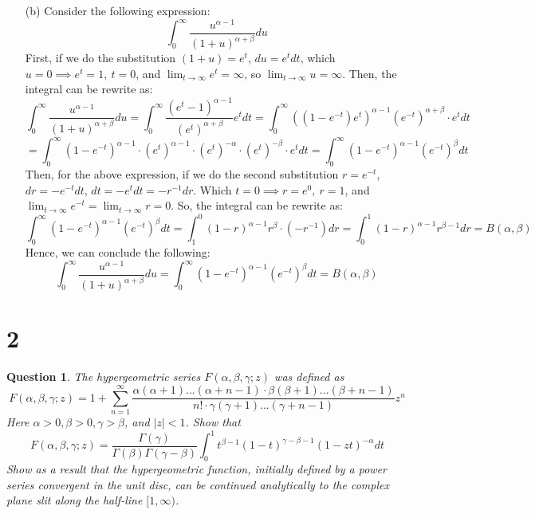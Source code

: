 \documentclass{article}
\newtheorem{question}{Question}
\begin{document}
\begin{itemize}
    \item[(b)] Consider the following expression:
    $$\int_{0}^{\infty}\frac{u^{\alpha-1}}{(1+u)^{\alpha+\beta}}du$$
    First, if we do the substitution $(1+u)=e^t$, $du=e^tdt$, which $u=0\implies e^t=1,\ t=0$, and $\lim_{t\rightarrow\infty}e^t=\infty$, so $\lim_{t\rightarrow\infty}u=\infty$. Then, the integral can be rewrite as:
    $$\int_{0}^{\infty}\frac{u^{\alpha-1}}{(1+u)^{\alpha+\beta}}du=\int_{0}^{\infty}\frac{(e^t-1)^{\alpha-1}}{(e^t)^{\alpha+\beta}}e^tdt=\int_{0}^{\infty}((1-e^{-t})e^t)^{\alpha-1}(e^{-t})^{\alpha+\beta}\cdot e^tdt$$
    $$=\int_{0}^{\infty}(1-e^{-t})^{\alpha-1}\cdot (e^{t})^{\alpha-1}\cdot (e^{t})^{-\alpha}\cdot (e^t)^{-\beta}\cdot e^tdt = \int_{0}^{\infty}(1-e^{-t})^{\alpha-1}(e^{-t})^\beta dt$$
    Then, for the above expression, if we do the second substitution $r=e^{-t}$, $dr=-e^{-t}dt$, $dt=-e^tdt = -r^{-1}dr$. Which $t=0\implies r=e^0,\ r=1$, and $\lim_{t\rightarrow\infty}e^{-t}=\lim_{t\rightarrow\infty}r=0$. So, the integral can be rewrite as:
    $$\int_{0}^{\infty}(1-e^{-t})^{\alpha-1}(e^{-t})^\beta dt=\int_{1}^{0}(1-r)^{\alpha-1}r^{\beta}\cdot (-r^{-1})dr = \int_{0}^{1}(1-r)^{\alpha-1}r^{\beta-1}dr = B(\alpha,\beta)$$
    Hence, we can conclude the following:
    $$\int_{0}^{\infty}\frac{u^{\alpha-1}}{(1+u)^{\alpha+\beta}}du=\int_{0}^{\infty}(1-e^{-t})^{\alpha-1}(e^{-t})^\beta dt=B(\alpha,\beta)$$
\end{itemize}

\hfil

\hfil

\section*{2}
\begin{myBox}[]{}
    \begin{question}
        The hypergeometric series $F(\alpha,\beta,\gamma; z)$ was defined as 
        $$F(\alpha,\beta,\gamma;z)=1+\sum_{n=1}^{\infty}\frac{\alpha(\alpha+1)...(\alpha+n-1)\cdot \beta(\beta+1)...(\beta+n-1)}{n!\cdot \gamma(\gamma+1)...(\gamma+n-1)}z^n$$
        Here $\alpha>0,\beta>0,\gamma>\beta$, and $|z|<1$. Show that
        $$F(\alpha,\beta,\gamma;z)=\frac{\Gamma(\gamma)}{\Gamma(\beta)\Gamma(\gamma-\beta)}\int_{0}^{1}t^{\beta-1}(1-t)^{\gamma-\beta-1}(1-zt)^{-\alpha}dt$$
        Show as a result that the hypergeometric function, initially defined by a power series convergent in the unit disc, can be continued analytically to the complex plane slit along the half-line $[1,\infty)$.
    \end{question}
\end{myBox}
\end{document}
